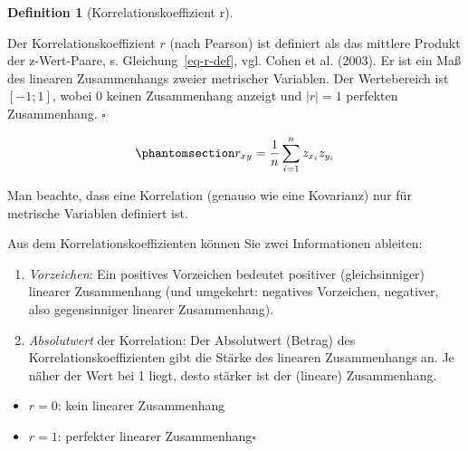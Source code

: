 \documentclass[
  a4paper,
]{scrbook}
\providecommand{\tightlist}{%
  \setlength{\itemsep}{0pt}\setlength{\parskip}{0pt}}\usepackage{longtable,booktabs,array}
\theoremstyle{definition}
\theoremstyle{definition}
\newtheorem{definition}{Definition}[chapter]
\theoremstyle{definition}
\theoremstyle{remark}
\begin{document}
\begin{definition}[Korrelationskoeffizient
r]\protect\hypertarget{def-r}{}\label{def-r}

Der Korrelationskoeffizient \(r\) (nach Pearson) ist definiert als das
mittlere Produkt der z-Wert-Paare, s. Gleichung~\ref{eq-r-def}, vgl.
Cohen et al. (2003). Er ist ein Maß des linearen Zusammenhangs zweier
metrischer Variablen. Der Wertebereich ist \([-1;1]\), wobei 0 keinen
Zusammenhang anzeigt und \(|r|=1\) perfekten Zusammenhang. \(\square\)

\end{definition}

\begin{equation}\phantomsection\label{eq-r-def}{r_{xy}=\frac{1}{n}\sum_{i=1}^n z_{x_i} z_{y_i}}\end{equation}

Man beachte, dass eine Korrelation (genauso wie eine Kovarianz) nur für
metrische Variablen definiert ist.

\begin{tcolorbox}[enhanced jigsaw, colbacktitle=quarto-callout-note-color!10!white, bottomrule=.15mm, left=2mm, breakable, rightrule=.15mm, coltitle=black, title=\textcolor{quarto-callout-note-color}{\faInfo}\hspace{0.5em}{Hinweis}, colback=white, leftrule=.75mm, titlerule=0mm, opacityback=0, bottomtitle=1mm, toprule=.15mm, arc=.35mm, toptitle=1mm, opacitybacktitle=0.6, colframe=quarto-callout-note-color-frame]

Aus dem Korrelationskoeffizienten können Sie zwei Informationen
ableiten:

\begin{enumerate}
\def\labelenumi{\arabic{enumi}.}
\tightlist
\item
  \emph{Vorzeichen}: Ein positives Vorzeichen bedeutet positiver
  (gleichsinniger) linearer Zusammenhang (und umgekehrt: negatives
  Vorzeichen, negativer, also gegensinniger linearer Zusammenhang).
\item
  \emph{Absolutwert} der Korrelation: Der Absolutwert (Betrag) des
  Korrelationskoeffizienten gibt die Stärke des linearen Zusammenhangs
  an. Je näher der Wert bei 1 liegt, desto stärker ist der (lineare)
  Zusammenhang.
\end{enumerate}

\begin{itemize}
\tightlist
\item
  \(r = 0\): kein linearer Zusammenhang
\item
  \(r = 1\): perfekter linearer Zusammenhang\(\square\)
\end{itemize}

\end{tcolorbox}
\end{document}

